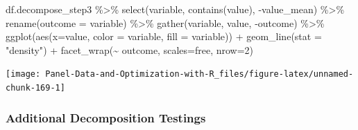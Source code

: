 \documentclass[
]{book}
\newenvironment{Shaded}{\begin{snugshade}}{\end{snugshade}}
\newcommand{\AttributeTok}[1]{\textcolor[rgb]{0.77,0.63,0.00}{#1}}
\newcommand{\DecValTok}[1]{\textcolor[rgb]{0.00,0.00,0.81}{#1}}
\newcommand{\FunctionTok}[1]{\textcolor[rgb]{0.00,0.00,0.00}{#1}}
\newcommand{\NormalTok}[1]{#1}
\newcommand{\SpecialCharTok}[1]{\textcolor[rgb]{0.00,0.00,0.00}{#1}}
\newcommand{\StringTok}[1]{\textcolor[rgb]{0.31,0.60,0.02}{#1}}
\begin{document}
\begin{Shaded}
\begin{Highlighting}[]
\NormalTok{df.decompose\_step3 }\SpecialCharTok{\%\textgreater{}\%}
    \FunctionTok{select}\NormalTok{(variable, }\FunctionTok{contains}\NormalTok{(}\StringTok{\textquotesingle{}value\textquotesingle{}}\NormalTok{), }\SpecialCharTok{{-}}\NormalTok{value\_mean) }\SpecialCharTok{\%\textgreater{}\%}
    \FunctionTok{rename}\NormalTok{(}\AttributeTok{outcome =}\NormalTok{ variable) }\SpecialCharTok{\%\textgreater{}\%}
    \FunctionTok{gather}\NormalTok{(variable, value, }\SpecialCharTok{{-}}\NormalTok{outcome) }\SpecialCharTok{\%\textgreater{}\%}
    \FunctionTok{ggplot}\NormalTok{(}\FunctionTok{aes}\NormalTok{(}\AttributeTok{x=}\NormalTok{value, }\AttributeTok{color =}\NormalTok{ variable, }\AttributeTok{fill =}\NormalTok{ variable)) }\SpecialCharTok{+}
        \FunctionTok{geom\_line}\NormalTok{(}\AttributeTok{stat =} \StringTok{"density"}\NormalTok{) }\SpecialCharTok{+}
        \FunctionTok{facet\_wrap}\NormalTok{(}\SpecialCharTok{\textasciitilde{}}\NormalTok{ outcome, }\AttributeTok{scales=}\StringTok{\textquotesingle{}free\textquotesingle{}}\NormalTok{, }\AttributeTok{nrow=}\DecValTok{2}\NormalTok{)}
\end{Highlighting}
\end{Shaded}

\begin{center}\texttt{[image: Panel-Data-and-Optimization-with-R\_files/figure-latex/unnamed-chunk-169-1]} \end{center}

\hypertarget{additional-decomposition-testings}{%
\subsubsection{Additional Decomposition Testings}\label{additional-decomposition-testings}}
\end{document}
